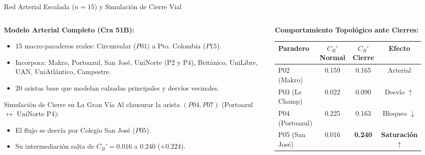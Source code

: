 \documentclass[aspectratio=169,10pt]{beamer}
\begin{document}
\begin{frame}{Red Arterial Escalada ($n=15$) y Simulación de Cierre Vial}
    \begin{columns}[T]
        \begin{column}{0.52\textwidth}
            \textbf{Modelo Arterial Completo (Cra 51B):}
            \begin{itemize}
                \item 15 macro-paraderos reales: Circunvalar ($P01$) a Pto. Colombia ($P15$).
                \item Incorpora: Makro, Portoazul, San José, UniNorte (P2 y P4), Británico, UniLibre, UAN, UniAtlántico, Campestre.
                \item 20 aristas base que modelan calzadas principales y desvíos vecinales.
            \end{itemize}
            \begin{alertblock}{Simulación de Cierre en La Gran Vía}
                Al clausurar la arista $(P04, P07)$ (Portoazul $\leftrightarrow$ UniNorte P4):
                \begin{itemize}
                    \item El flujo se desvía por Colegio San José ($P05$).
                    \item Su intermediación salta de $C_B'=0.016$ a $\mathbf{0.240}$ ($+0.224$).
                \end{itemize}
            \end{alertblock}
        \end{column}
        \begin{column}{0.48\textwidth}
            \textbf{Comportamiento Topológico ante Cierres:}
            \centering
            \small
            \begin{tabular}{lccc}
                \toprule
                \textbf{Paradero} & \textbf{$C_B'$ Normal} & \textbf{$C_B'$ Cierre} & \textbf{Efecto} \\
                \midrule
                P02 (Makro) & 0.159 & 0.165 & Arterial \\
                P03 (Le Champ) & 0.022 & 0.090 & Desvío $\uparrow$ \\
                P04 (Portoazul) & 0.225 & 0.163 & Bloqueo $\downarrow$ \\
                P05 (San José) & 0.016 & \textbf{0.240} & \textbf{Saturación} $\uparrow$ \\

\end{tabular}
\end{column}
\end{columns}
\end{frame}
\end{document}
